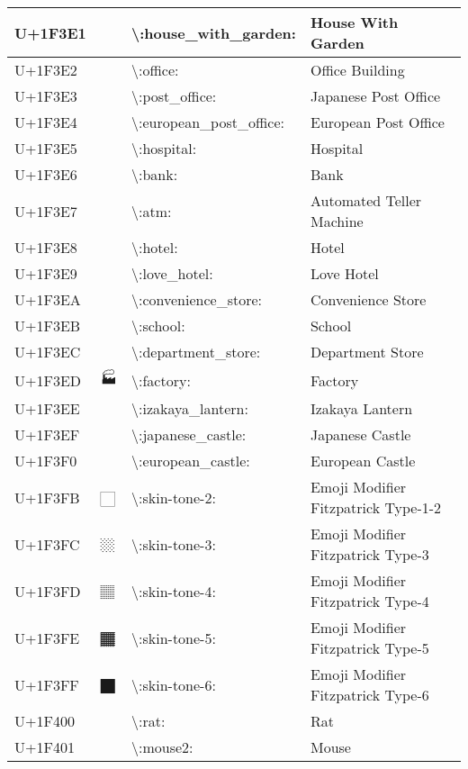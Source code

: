 \begin{table}[h]
\begin{tabulary}{\linewidth}{|L|L|L|L|}
\hline
U+1F3E1 & 🏡 & {\textbackslash}:house\_with\_garden: & House With Garden \\
\hline
U+1F3E2 & 🏢 & {\textbackslash}:office: & Office Building \\
\hline
U+1F3E3 & 🏣 & {\textbackslash}:post\_office: & Japanese Post Office \\
\hline
U+1F3E4 & 🏤 & {\textbackslash}:european\_post\_office: & European Post Office \\
\hline
U+1F3E5 & 🏥 & {\textbackslash}:hospital: & Hospital \\
\hline
U+1F3E6 & 🏦 & {\textbackslash}:bank: & Bank \\
\hline
U+1F3E7 & 🏧 & {\textbackslash}:atm: & Automated Teller Machine \\
\hline
U+1F3E8 & 🏨 & {\textbackslash}:hotel: & Hotel \\
\hline
U+1F3E9 & 🏩 & {\textbackslash}:love\_hotel: & Love Hotel \\
\hline
U+1F3EA & 🏪 & {\textbackslash}:convenience\_store: & Convenience Store \\
\hline
U+1F3EB & 🏫 & {\textbackslash}:school: & School \\
\hline
U+1F3EC & 🏬 & {\textbackslash}:department\_store: & Department Store \\
\hline
U+1F3ED & 🏭 & {\textbackslash}:factory: & Factory \\
\hline
U+1F3EE & 🏮 & {\textbackslash}:izakaya\_lantern: & Izakaya Lantern \\
\hline
U+1F3EF & 🏯 & {\textbackslash}:japanese\_castle: & Japanese Castle \\
\hline
U+1F3F0 & 🏰 & {\textbackslash}:european\_castle: & European Castle \\
\hline
U+1F3FB & 🏻 & {\textbackslash}:skin-tone-2: & Emoji Modifier Fitzpatrick Type-1-2 \\
\hline
U+1F3FC & 🏼 & {\textbackslash}:skin-tone-3: & Emoji Modifier Fitzpatrick Type-3 \\
\hline
U+1F3FD & 🏽 & {\textbackslash}:skin-tone-4: & Emoji Modifier Fitzpatrick Type-4 \\
\hline
U+1F3FE & 🏾 & {\textbackslash}:skin-tone-5: & Emoji Modifier Fitzpatrick Type-5 \\
\hline
U+1F3FF & 🏿 & {\textbackslash}:skin-tone-6: & Emoji Modifier Fitzpatrick Type-6 \\
\hline
U+1F400 & 🐀 & {\textbackslash}:rat: & Rat \\
\hline
U+1F401 & 🐁 & {\textbackslash}:mouse2: & Mouse \\

\end{tabulary}
\end{table}

